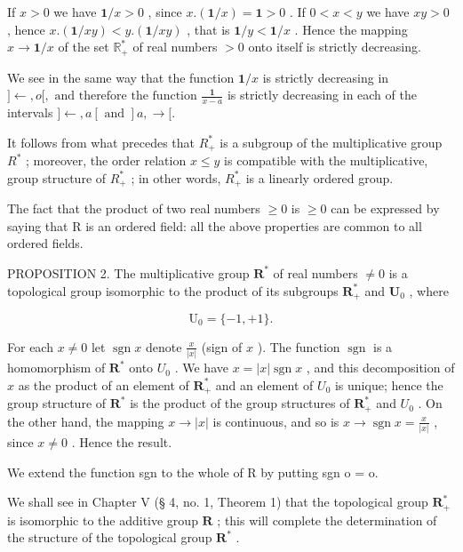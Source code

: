 If \(x > 0\) we have \(\mathbf{1} / x > 0\) , since \(x.(\mathbf{1} / x) = \mathbf{1} > 0\) . If \(0 < x < y\) we have \(xy > 0\) , hence \(x.(\mathbf{1} / xy) < y.(\mathbf{1} / xy)\) , that is \(\mathbf{1} / y < \mathbf{1} / x\) . Hence the mapping \(x \to \mathbf{1} / x\) of the set \(\mathbb{R}_+^*\) of real numbers \(> 0\) onto itself is strictly decreasing.

We see in the same way that the function \(\mathbf{1} / x\) is strictly decreasing in \(] \leftarrow, o[, \text{ and therefore the function } \frac{\mathbf{1}}{x - a}\) is strictly decreasing in each of the intervals \(] \leftarrow, a[ \text{ and } ]a, \rightarrow [.\)

It follows from what precedes that \(R_{+}^{*}\) is a subgroup of the multiplicative group \(R^{*}\) ; moreover, the order relation \(x \leqslant y\) is compatible with the multiplicative, group structure of \(R_{+}^{*}\) ; in other words, \(R_{+}^{*}\) is a linearly ordered group.

The fact that the product of two real numbers \(\geqslant0\) is \(\geqslant0\) can be expressed by saying that R is an ordered field: all the above properties are common to all ordered fields.

PROPOSITION 2. The multiplicative group \(\mathbf{R}^{*}\) of real numbers \(\neq 0\) is a topological group isomorphic to the product of its subgroups \(\mathbf{R}_{+}^{*}\) and \(\mathbf{U}_{0}\) , where

\[
\mathrm{U} _ {0} = \{- 1, + 1 \}.
\]

For each \(x \neq 0\) let \(\operatorname{sgn} x\) denote \(\frac{x}{|x|}\) (sign of \(x\) ). The function \(\operatorname{sgn}\) is a homomorphism of \(\mathbf{R}^*\) onto \(U_0\) . We have \(x = |x| \operatorname{sgn} x\) , and this decomposition of \(x\) as the product of an element of \(\mathbf{R}_+^*\) and an element of \(U_0\) is unique; hence the group structure of \(\mathbf{R}^*\) is the product of the group structures of \(\mathbf{R}_+^*\) and \(U_0\) . On the other hand, the mapping \(x \to |x|\) is continuous, and so is \(x \to \operatorname{sgn} x = \frac{x}{|x|}\) , since \(x \neq 0\) . Hence the result.

We extend the function sgn to the whole of R by putting sgn o = o.

We shall see in Chapter V (§ 4, no. 1, Theorem 1) that the topological group \(\mathbf{R}_{+}^{*}\) is isomorphic to the additive group \(\mathbf{R}\) ; this will complete the determination of the structure of the topological group \(\mathbf{R}^{*}\) .

